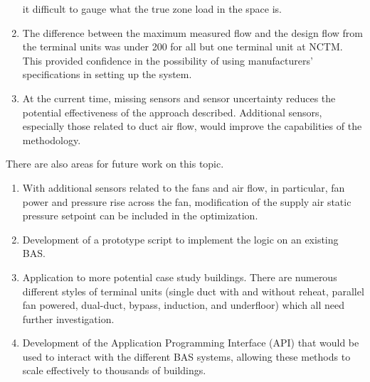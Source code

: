 \begin{enumerate}
        it difficult to gauge what the true zone load in the space is.
    \item The difference between the maximum measured flow and the design flow
        from the terminal units was under \SI{200}{\CFM} for all but one
        terminal unit at NCTM. This provided confidence in the
        possibility of using manufacturers' specifications in setting up
        the system.
    \item At the current time, missing sensors and sensor uncertainty
        reduces the potential effectiveness of the approach described.
        Additional sensors, especially those related to duct air flow,
        would improve the capabilities of the methodology.
\end{enumerate}

There are also areas for future work on this topic.

\begin{enumerate}
    \item With additional sensors related to the fans and air flow, in
        particular, fan power and pressure rise across the fan,
        modification of the supply air static pressure setpoint can be
        included in the optimization.
    \item Development of a prototype script to implement the logic on an
        existing BAS.
    \item Application to more potential case study buildings. There are
        numerous different styles of terminal units (single duct with
        and without reheat, parallel fan powered, dual-duct, bypass,
        induction, and underfloor) which all need
        further investigation. 
    \item Development of the Application Programming Interface (API)
        that would be used to interact with the different BAS systems, allowing
        these methods to scale effectively to thousands of buildings. 
\end{enumerate}

